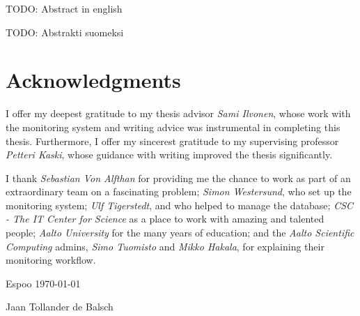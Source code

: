 \makecoverpage
\makecopyrightpage


\begin{abstractpage}[english]
TODO: Abstract in english
\end{abstractpage}



\begin{abstractpage}[finnish]
TODO: Abstrakti suomeksi
\end{abstractpage}


\section*{Acknowledgments}
I offer my deepest gratitude to my thesis advisor \emph{Sami Ilvonen}, whose work with the monitoring system and writing advice was instrumental in completing this thesis.
Furthermore, I offer my sincerest gratitude to my supervising professor \emph{Petteri Kaski}, whose guidance with writing improved the thesis significantly.

I thank \emph{Sebastian Von Alfthan} for providing me the chance to work as part of an extraordinary team on a fascinating problem; \emph{Simon Westersund}, who set up the monitoring system; \emph{Ulf Tigerstedt}, and who helped to manage the database;
\emph{CSC - The IT Center for Science} as a place to work with amazing and talented people; \emph{Aalto University} for the many years of education; and the \emph{Aalto Scientific Computing} admins, \emph{Simo Tuomisto} and \emph{Mikko Hakala}, for explaining their monitoring workflow.

\vspace{5cm}
Espoo \today

\vspace{5mm}
{\hfill Jaan Tollander de Balsch \hspace{1cm}}

\newpage

\setcounter{tocdepth}{2}
\tableofcontents
